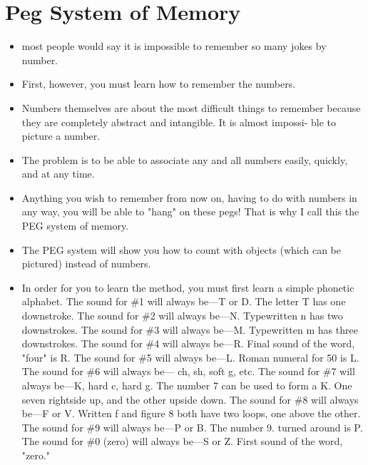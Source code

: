     \section*{Peg System of Memory}
        \begin{itemize}
            \item most people would
            say it is impossible to remember so many jokes by number.
            \item First, however, you must learn
            how to remember the numbers.
            \item Numbers themselves are
            about the most difficult things to remember because they
            are completely abstract and intangible. It is almost impossi-
            ble to picture a number.
            \item The problem is to be able to
            associate any and all numbers easily, quickly, and at any
            time.
            \item Anything you wish to remember from now on, having to do
            with numbers in any way, you will be able to "hang" on
            these pegs! That is why I call this the PEG system of
            memory.
            \item The PEG system will show you how to count with
            objects (which can be pictured) instead of numbers.
            \item In order for you to learn the method, you must first
            learn a simple phonetic alphabet.
                \subitem The sound for \#1 will always be—T or D. The letter
            T has one downstroke.
                \subitem The sound for \#2 will always be—N. Typewritten n has
            two downstrokes.
                \subitem The sound for \#3 will always be—M. Typewritten m
            has three downstrokes.
                \subitem The sound for \#4 will always be—R. Final sound of
            the word, "four" is R.
                \subitem The sound for \#5 will always be—L. Roman numeral
            for 50 is L.
                \subitem The sound for \#6 will always be— ch, sh, soft g, etc.
                \subitem The sound for \#7 will always be—K, hard c, hard g. The
number 7 can be used to form a K. One seven rightside up,
and the other upside down.
                \subitem The sound for \#8 will always be—F or V. Written f
and figure 8 both have two loops, one above the other.
                \subitem The sound for \#9 will always be—P or B. The number
9. turned around is P.
                \subitem The sound for \#0 (zero) will always be—S or Z. First
sound of the word, "zero."


\end{itemize}
